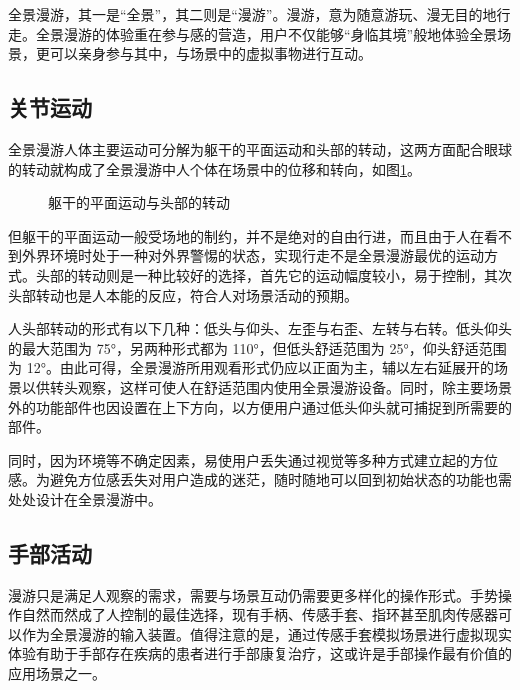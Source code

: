 全景漫游，其一是“全景”，其二则是“漫游”。漫游，意为随意游玩、漫无目的地行走。全景漫游的体验重在参与感的营造，用户不仅能够“身临其境”般地体验全景场景，更可以亲身参与其中，与场景中的虚拟事物进行互动。

\subsection{关节运动}

全景漫游人体主要运动可分解为躯干的平面运动和头部的转动，这两方面配合眼球的转动就构成了全景漫游中人个体在场景中的位移和转向，如图\ref{fig:act}。

\begin{figure}[htp]
\centering
{}
\caption{躯干的平面运动与头部的转动}
\label{fig:act}
\end{figure}

但躯干的平面运动一般受场地的制约，并不是绝对的自由行进，而且由于人在看不到外界环境时处于一种对外界警惕的状态，实现行走不是全景漫游最优的运动方式。头部的转动则是一种比较好的选择，首先它的运动幅度较小，易于控制，其次头部转动也是人本能的反应，符合人对场景活动的预期。

人头部转动的形式有以下几种：低头与仰头、左歪与右歪、左转与右转。低头仰头的最大范围为 75°，另两种形式都为 110°，但低头舒适范围为 25°，仰头舒适范围为 12°。由此可得，全景漫游所用观看形式仍应以正面为主，辅以左右延展开的场景以供转头观察，这样可使人在舒适范围内使用全景漫游设备。同时，除主要场景外的功能部件也因设置在上下方向，以方便用户通过低头仰头就可捕捉到所需要的部件。

同时，因为环境等不确定因素，易使用户丢失通过视觉等多种方式建立起的方位感。为避免方位感丢失对用户造成的迷茫，随时随地可以回到初始状态的功能也需处处设计在全景漫游中。

\subsection{手部活动}

漫游只是满足人观察的需求，需要与场景互动仍需要更多样化的操作形式。手势操作自然而然成了人控制的最佳选择，现有手柄、传感手套、指环甚至肌肉传感器可以作为全景漫游的输入装置。值得注意的是，通过传感手套模拟场景进行虚拟现实体验有助于手部存在疾病的患者进行手部康复治疗，这或许是手部操作最有价值的应用场景之一。

